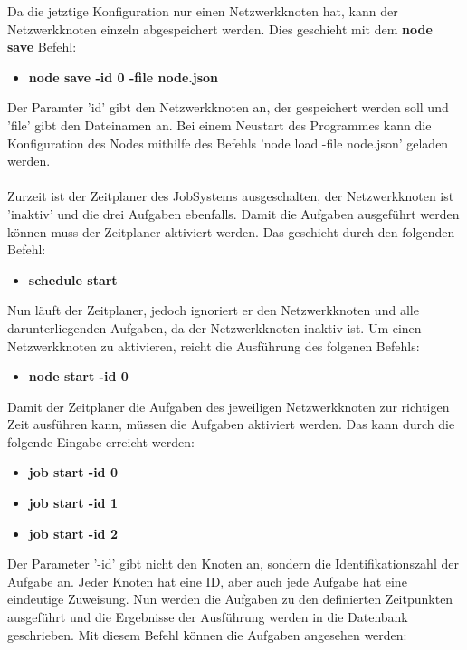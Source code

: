 \documentclass[12pt,a4paper]{report}
\begin{document}
\begin{onehalfspace}
Da die jetztige Konfiguration nur einen Netzwerkknoten hat, kann der Netzwerkknoten einzeln abgespeichert werden. Dies geschieht mit dem \textbf{node save} Befehl:\\

\begin{itemize}
\item \textbf{node save -id 0 -file node.json}
\end{itemize}

Der Paramter 'id' gibt den Netzwerkknoten an, der gespeichert werden soll und 'file' gibt den Dateinamen an. Bei einem Neustart des Programmes kann die Konfiguration des Nodes mithilfe des Befehls 'node load -file node.json' geladen werden.\\\\
Zurzeit ist der Zeitplaner des JobSystems ausgeschalten, der Netzwerkknoten ist 'inaktiv' und die drei Aufgaben ebenfalls. Damit die Aufgaben ausgeführt werden können muss der Zeitplaner aktiviert werden. Das geschieht durch den folgenden Befehl:\\

\begin{itemize}
\item \textbf{schedule start}
\end{itemize}

Nun läuft der Zeitplaner, jedoch ignoriert er den Netzwerkknoten und alle darunterliegenden Aufgaben, da der Netzwerkknoten inaktiv ist. Um einen Netzwerkknoten zu aktivieren, reicht die Ausführung des folgenen Befehls:\\

\begin{itemize}
\item \textbf{node start -id 0}
\end{itemize}

Damit der Zeitplaner die Aufgaben des jeweiligen Netzwerkknoten zur richtigen Zeit ausführen kann, müssen die Aufgaben aktiviert werden. Das kann durch die folgende Eingabe erreicht werden:\\

\begin{itemize}
\item \textbf{job start -id 0}
\item \textbf{job start -id 1}
\item \textbf{job start -id 2}
\end{itemize}

Der Parameter '-id' gibt nicht den Knoten an, sondern die Identifikationszahl der Aufgabe an. Jeder Knoten hat eine ID, aber auch jede Aufgabe hat eine eindeutige Zuweisung. Nun werden die Aufgaben zu den definierten Zeitpunkten ausgeführt und die Ergebnisse der Ausführung werden in die Datenbank geschrieben. Mit diesem Befehl können die Aufgaben angesehen werden: \\


\end{onehalfspace}
\end{document}
